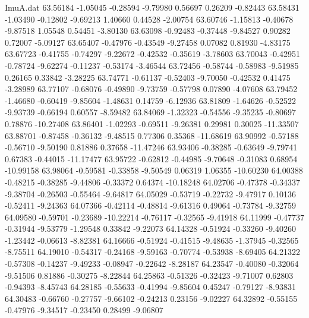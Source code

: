 \begin{filecontents}{ImuA.dat}
  63.56184   -1.05045   -0.28594   -9.79980    0.56697    0.26209   -0.82443
  63.58431   -1.03490   -0.12802   -9.69213    1.40660    0.44528   -2.00754
  63.60746   -1.15813   -0.40678   -9.87518    1.05548    0.54451   -3.80130
  63.63098   -0.92483   -0.37448   -9.84527    0.90282    0.72007   -5.09127
  63.65407   -0.47976   -0.43549   -9.27458    0.07082    0.81930   -4.83175
  63.67723   -0.41755   -0.74297   -9.22672   -0.42532   -0.35619   -3.78603
  63.70043   -0.42951   -0.78724   -9.62274   -0.11237   -0.53174   -3.46544
  63.72456   -0.58744   -0.58983   -9.51985    0.26165    0.33842   -3.28225
  63.74771   -0.61137   -0.52403   -9.70050   -0.42532    0.41475   -3.28989
  63.77107   -0.68076   -0.49890   -9.73759   -0.57798    0.07890   -4.07608
  63.79452   -1.46680   -0.60419   -9.85604   -1.48631    0.14759   -6.12936
  63.81809   -1.64626   -0.52522   -9.93739   -0.66194    0.60557   -8.59482
  63.84069   -1.32323   -0.54556   -9.35235   -0.80697    0.78876  -10.27408
  63.86401   -1.02293   -0.69511   -9.26381    0.29981    0.30025  -11.33507
  63.88701   -0.87458   -0.36132   -9.48515    0.77306    0.35368  -11.68619
  63.90992   -0.57188   -0.56710   -9.50190    0.81886    0.37658  -11.47246
  63.93406   -0.38285   -0.63649   -9.79741    0.67383   -0.44015  -11.17477
  63.95722   -0.62812   -0.44985   -9.70648   -0.31083    0.68954  -10.99158
  63.98064   -0.59581   -0.33858   -9.50549    0.06319    1.06355  -10.60230
  64.00388   -0.48215   -0.38285   -9.44806   -0.33372    0.64374  -10.18248
  64.02706   -0.47378   -0.34337   -9.38704   -0.26503   -0.55464   -9.64817
  64.05029   -0.53719   -0.22732   -9.47917    0.10136   -0.52411   -9.24363
  64.07366   -0.42114   -0.48814   -9.61316    0.49064   -0.73784   -9.32759
  64.09580   -0.59701   -0.23689  -10.22214   -0.76117   -0.32565   -9.41918
  64.11999   -0.47737   -0.31944   -9.53779   -1.29548    0.33842   -9.22073
  64.14328   -0.51924   -0.33260   -9.40260   -1.23442   -0.06613   -8.82381
  64.16666   -0.51924   -0.41515   -9.48635   -1.37945   -0.32565   -8.75511
  64.19010   -0.54317   -0.24168   -9.59163   -0.70774   -0.53938   -8.69405
  64.21322   -0.57308   -0.14237   -9.49233   -0.08947   -0.22642   -8.28187
  64.23547   -0.40080   -0.32064   -9.51506    0.81886   -0.30275   -8.22844
  64.25863   -0.51326   -0.32423   -9.71007    0.62803   -0.94393   -8.45743
  64.28185   -0.55633   -0.41994   -9.85604    0.45247   -0.79127   -8.93831
  64.30483   -0.66760   -0.27757   -9.66102   -0.24213    0.23156   -9.02227
  64.32892   -0.55155   -0.47976   -9.34517   -0.23450    0.28499   -9.06807

\end{filecontents}
